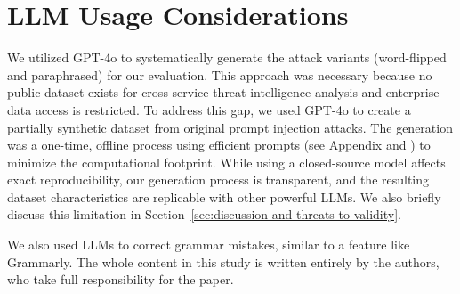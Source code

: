\section{LLM Usage Considerations}

We utilized GPT-4o to systematically generate the attack variants (word-flipped and paraphrased) for our evaluation. This approach was necessary because no public dataset exists for cross-service threat intelligence analysis and enterprise data access is restricted. To address this gap, we used GPT-4o to create a partially synthetic dataset from original prompt injection attacks. The generation was a one-time, offline process using efficient prompts (see Appendix  and ) to minimize the computational footprint. While using a closed-source model affects exact reproducibility, our generation process is transparent, and the resulting dataset characteristics are replicable with other powerful LLMs. We also briefly discuss this limitation in Section~\ref{sec:discussion-and-threats-to-validity}.

We also used LLMs to correct grammar mistakes, similar to a feature like Grammarly. The whole content in this study is written entirely by the authors, who take full responsibility for the paper.



